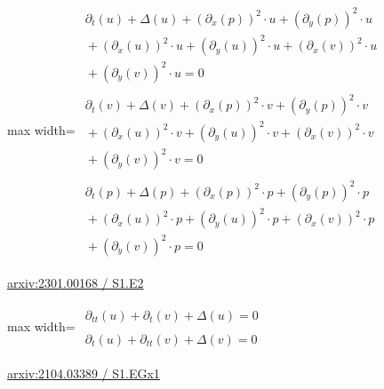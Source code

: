 \documentclass[10pt,a4paper]{article}
\begin{document}
\begin{minipage}{\linewidth}
\begin{center}\begin{adjustbox}{max width=\linewidth}$\displaystyle\begin{gathered}\begin{gathered}\partial_{t}(u)+\Delta(u)+(\partial_{x}(p))^{2}\cdot u+(\partial_{y}(p))^{2}\cdot u\\[-1pt]{}+(\partial_{x}(u))^{2}\cdot u+(\partial_{y}(u))^{2}\cdot u+(\partial_{x}(v))^{2}\cdot u\\[-1pt]{}+(\partial_{y}(v))^{2}\cdot u=0\end{gathered}\\[5pt]\begin{gathered}\partial_{t}(v)+\Delta(v)+(\partial_{x}(p))^{2}\cdot v+(\partial_{y}(p))^{2}\cdot v\\[-1pt]{}+(\partial_{x}(u))^{2}\cdot v+(\partial_{y}(u))^{2}\cdot v+(\partial_{x}(v))^{2}\cdot v\\[-1pt]{}+(\partial_{y}(v))^{2}\cdot v=0\end{gathered}\\[5pt]\begin{gathered}\partial_{t}(p)+\Delta(p)+(\partial_{x}(p))^{2}\cdot p+(\partial_{y}(p))^{2}\cdot p\\[-1pt]{}+(\partial_{x}(u))^{2}\cdot p+(\partial_{y}(u))^{2}\cdot p+(\partial_{x}(v))^{2}\cdot p\\[-1pt]{}+(\partial_{y}(v))^{2}\cdot p=0\end{gathered}\end{gathered}$\end{adjustbox}\end{center}
{\small \href{https://arxiv.org/html/2301.00168#S1.E2}{arxiv:2301.00168 / S1.E2}}\par
\end{minipage}\par\vspace{7mm}

\begin{minipage}{\linewidth}
\begin{center}\begin{adjustbox}{max width=\linewidth}$\displaystyle\begin{gathered}\begin{gathered}\partial_{tt}(u)+\partial_{t}(v)+\Delta(u)=0\end{gathered}\\[5pt]\begin{gathered}\partial_{t}(u)+\partial_{tt}(v)+\Delta(v)=0\end{gathered}\end{gathered}$\end{adjustbox}\end{center}
{\small \href{https://arxiv.org/html/2104.03389#S1.EGx1}{arxiv:2104.03389 / S1.EGx1}}\par
\end{minipage}\par\vspace{7mm}
\end{document}
